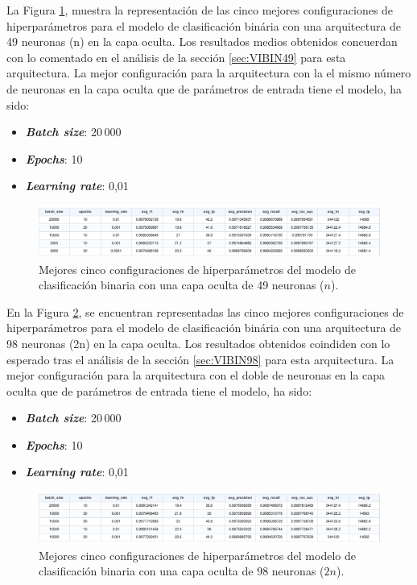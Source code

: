 La Figura \ref{fig:BINhs49}, muestra la representación de las cinco mejores configuraciones de hiperparámetros para el modelo de clasificación binária con una arquitectura de 49 neuronas (n) en la capa oculta. Los resultados medios obtenidos concuerdan con lo comentado en el análisis de la sección \ref{sec:VIBIN49} para esta arquitectura. La mejor configuración para la arquitectura con la el mismo número de neuronas en la capa oculta que de parámetros de entrada tiene el modelo, ha sido:
\begin{itemize}
	\item \textbf{\textit{Batch size}}: 20\,000
	\item \textbf{\textit{Epochs}}: 10
	\item \textbf{\textit{Learning rate}}: 0,01
\end{itemize}

\begin{figure}[H]
    \centering
    \includegraphics[width=1\textwidth]{./img/modelo/BINhs49.pdf}
    \caption{Mejores cinco configuraciones de hiperparámetros del modelo de clasificación binaria con una capa oculta de 49 neuronas ($n$).}
    \label{fig:BINhs49}
\end{figure}


En la Figura \ref{fig:BINhs98}, se encuentran representadas las cinco mejores configuraciones de hiperparámetros para el modelo de clasificación binária con una arquitectura de 98 neuronas (2n) en la capa oculta. Los resultados obtenidos coindiden con lo esperado tras el análisis de la sección \ref{sec:VIBIN98} para esta arquitectura. La mejor configuración para la arquitectura con el doble de neuronas en la capa oculta que de parámetros de entrada tiene el modelo, ha sido:
\begin{itemize}
	\item \textbf{\textit{Batch size}}: 20\,000
	\item \textbf{\textit{Epochs}}: 10
	\item \textbf{\textit{Learning rate}}: 0,01
\end{itemize}

\begin{figure}[H]
    \centering
    \includegraphics[width=1\textwidth]{./img/modelo/BINhs98.pdf}
    \caption{Mejores cinco configuraciones de hiperparámetros del modelo de clasificación binaria con una capa oculta de 98 neuronas ($2n$).}
    \label{fig:BINhs98}
\end{figure}

